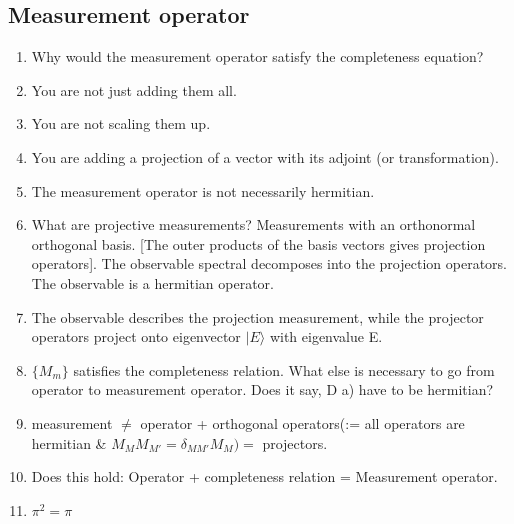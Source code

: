 \documentclass{article}
\begin{document}
    \subsection{Measurement operator}
    \begin{enumerate}
        \item Why would the measurement operator satisfy the completeness equation? 
        \item You are not just adding them all. 
        \item You are not scaling them up. 
        \item You are adding a projection of a vector with its adjoint (or transformation). 
        \item The measurement operator is not necessarily hermitian. 
        \item What are projective measurements? Measurements with an orthonormal orthogonal basis. [The outer products of the basis vectors gives projection operators]. The observable spectral decomposes into the projection operators. The observable is a hermitian operator. 
        \item The observable describes the projection measurement, while the projector operators project onto eigenvector $|E\rangle$ with eigenvalue E. \
        \item $\{M_m\}$ satisfies the completeness relation. What else is necessary to go from operator to measurement operator. Does it say, D a) have to be hermitian? 
        \item measurement $\neq$ operator + orthogonal operators(:= all operators are hermitian \& $ M_M M_{M'} = \delta_{MM'} M_M) = $ projectors. 
        \item Does this hold: Operator + completeness relation = Measurement operator.
        \item $\pi^2 = \pi$

    \end{enumerate}
    
\end{document}
